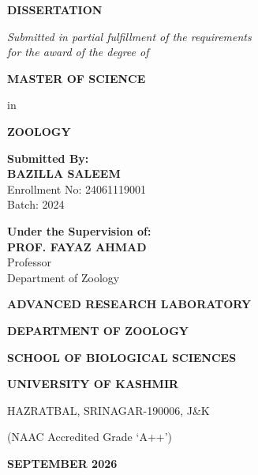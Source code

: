 
\begin{titlepage}
\thispagestyle{empty}
\begin{center}
\vspace*{0.3in}

{\Large \bfseries \distitlecover\par}

\vspace{0.8in}

{\large \textbf{DISSERTATION}\par}
\vspace{0.1in}
{\normalsize \textit{Submitted in partial fulfillment of the requirements\\
for the award of the degree of}\par}

\vspace{0.3in}

{\large \bfseries MASTER OF SCIENCE\par}
{\normalsize in\par}
{\large \bfseries ZOOLOGY\par}

\vspace{0.8in}

\begin{minipage}{0.48\textwidth}
\begin{flushleft}
\textbf{Submitted By:}\\
\textbf{BAZILLA SALEEM}\\
Enrollment No: 24061119001\\
Batch: 2024
\end{flushleft}
\end{minipage}
\hfill
\begin{minipage}{0.48\textwidth}
\begin{flushright}
\textbf{Under the Supervision of:}\\
\textbf{PROF. FAYAZ AHMAD}\\
Professor\\
Department of Zoology
\end{flushright}
\end{minipage}

\vfill

{\bfseries ADVANCED RESEARCH LABORATORY\par}
{\bfseries DEPARTMENT OF ZOOLOGY\par}
{\bfseries SCHOOL OF BIOLOGICAL SCIENCES\par}
{\bfseries UNIVERSITY OF KASHMIR\par}
{\normalsize HAZRATBAL, SRINAGAR-190006, J\&K\par}
{\footnotesize (NAAC Accredited Grade `A++')\par}
\vspace{0.2in}
{\large \bfseries SEPTEMBER 2026\par}

\end{center}
\end{titlepage}
